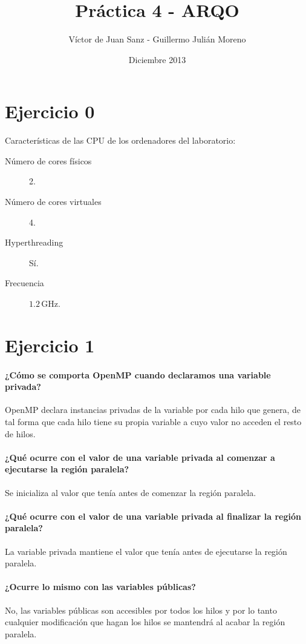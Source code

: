 \documentclass{apuntes}
\title{Pr\'{a}ctica 4 - ARQO}
\date{Diciembre 2013}
\author{V\'{i}ctor de Juan Sanz - Guillermo Juli\'{a}n Moreno}
\begin{document}
\maketitle
\newpage

\pagestyle{plain}

\section*{Ejercicio 0}

Características de las CPU de los ordenadores del laboratorio:

\begin{description}
\item[Número de cores físicos] 2.
\item[Número de cores virtuales] 4.
\item[Hyperthreading] Sí.
\item[Frecuencia] $1.2\,\mathrm{GHz}$.
\end{description}

\section*{Ejercicio 1}

\paragraph{¿Cómo se comporta OpenMP cuando declaramos una variable privada?} OpenMP declara instancias privadas de la variable por cada hilo que genera, de tal forma que cada hilo tiene su propia variable a cuyo valor no acceden el resto de hilos.

\paragraph{¿Qué ocurre con el valor de una variable privada al comenzar a ejecutarse la región paralela?} Se inicializa al valor que tenía antes de comenzar la región paralela.

\paragraph{¿Qué ocurre con el valor de una variable privada al finalizar la región paralela?} La variable privada mantiene el valor que tenía antes de ejecutarse la región paralela.

\paragraph{¿Ocurre lo mismo con las variables públicas?} No, las variables públicas son accesibles por todos los hilos y por lo tanto cualquier modificación que hagan los hilos se mantendrá al acabar la región paralela.
\end{document}
